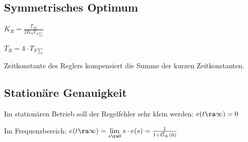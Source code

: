 \documentclass[fs, german]{latex4ei_fs}
\begin{document}
\begin{sectionbox}
\subsection{Symmetrisches Optimum}
$K_R = \frac{T_{S1}}{2 K_S T_{S \sum}}$

$T_R = 4 \cdot T_{S \sum}$

Zeitkonstante des Reglers kompensiert die Summe der kurzen Zeitkonstanten.

\end{sectionbox}
\begin{sectionbox}

\subsection{Stationäre Genauigkeit} 

Im stationären Betrieb soll der Regelfehler sehr klein werden:
$e (t \ra \infty) = 0$

Im Frequenzbereich:
$e (t \ra \infty) = \lim \limits_{s \ra 0} s \cdot e(s) = \frac{1}{1 + \vec G_K (0)}$
\end{sectionbox}
\end{document}
